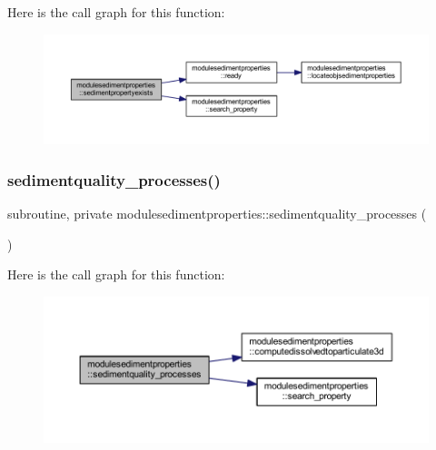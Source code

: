 Here is the call graph for this function\+:\nopagebreak
\begin{figure}[H]
\begin{center}
\leavevmode
\includegraphics[width=350pt]{namespacemodulesedimentproperties_a5b50162eeb042d1b89c4fc2ed2edfa45_cgraph}
\end{center}
\end{figure}
\mbox{\label{namespacemodulesedimentproperties_a226feff76b7adff9c39d5d0b84ea662e}} 
\subsubsection{\texorpdfstring{sedimentquality\+\_\+processes()}{sedimentquality\_processes()}}
{\footnotesize\ttfamily subroutine, private modulesedimentproperties\+::sedimentquality\+\_\+processes (\begin{DoxyParamCaption}{ }\end{DoxyParamCaption})\hspace{0.3cm}{\ttfamily [private]}}

Here is the call graph for this function\+:\nopagebreak
\begin{figure}[H]
\begin{center}
\leavevmode
\includegraphics[width=350pt]{namespacemodulesedimentproperties_a226feff76b7adff9c39d5d0b84ea662e_cgraph}
\end{center}
\end{figure}
\mbox{\label{namespacemodulesedimentproperties_a9049928f5adeb27938b063b548a194af}} 
